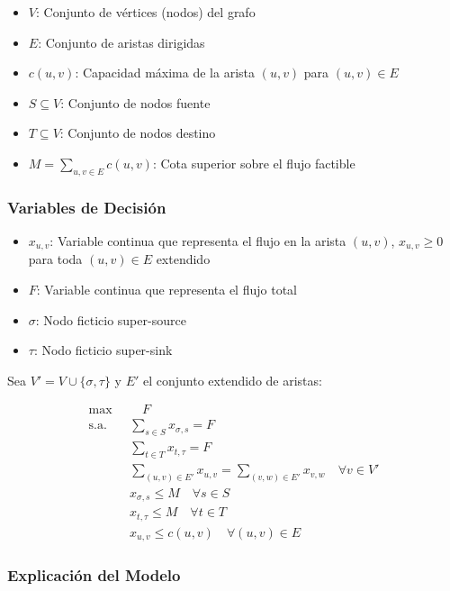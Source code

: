 \documentclass[12pt]{article}
\begin{document}
\begin{itemize}
    \item $V$: Conjunto de vértices (nodos) del grafo
    \item $E$: Conjunto de aristas dirigidas
    \item $c(u,v)$: Capacidad máxima de la arista $(u,v)$ para $(u,v) \in E$
    \item $S \subseteq V$: Conjunto de nodos fuente
    \item $T \subseteq V$: Conjunto de nodos destino
    \item $M = \sum_{u,v \in E} c(u,v)$: Cota superior sobre el flujo factible
\end{itemize}

\subsubsection*{Variables de Decisión}

\begin{itemize}
    \item $x_{u,v}$: Variable continua que representa el flujo en la arista $(u,v)$, $x_{u,v} \geq 0$ para toda $(u,v) \in E$ extendido
    \item $F$: Variable continua que representa el flujo total
    \item $\sigma$: Nodo ficticio super-source
    \item $\tau$: Nodo ficticio super-sink
\end{itemize}

Sea $V' = V \cup \{\sigma, \tau\}$ y $E'$ el conjunto extendido de aristas:

\begin{align*}
  \max & \quad F \\
  \text{s.a.} \quad
    & \sum_{s \in S} x_{\sigma,s} = F \\
    & \sum_{t \in T} x_{t,\tau} = F \\
    & \sum_{(u,v) \in E'} x_{u,v} = \sum_{(v,w) \in E'} x_{v,w} \quad \forall v \in V' \\
    & x_{\sigma,s} \leq M \quad \forall s \in S \\
    & x_{t,\tau} \leq M \quad \forall t \in T \\
    & x_{u,v} \leq c(u,v) \quad \forall (u,v) \in E
\end{align*}

\subsubsection{Explicación del Modelo}
\end{document}
